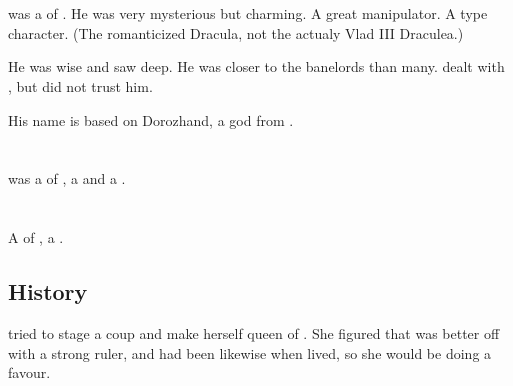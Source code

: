 \section{\Dorzand}
\index{\Dorzand}
\Dorzand was a \sathariah of \TiphredSerah.
He was very mysterious but charming.
A great manipulator.
A  type character. 
(The romanticized Dracula, not the actualy Vlad III Draculea.)

He was wise and saw deep.
He was closer to the banelords than many.
\Azraid dealt with \Dorzand, but did not trust him.

His name is based on Dorozhand, a god from 
\cite[]{LordDunsany:TheGodsofPegana}. 















\section{\Essaryn}
\index{\Essaryn}
\Essaryn was a \resvil{} of \TiphredSerah, a \thelyad and a . 















\section{\Ishicah}
\index{\Ishicah}
A \resvil{} of \TiphredSerah, a \sathariah{}. 









\subsection{History}
\Ishicah{} tried to stage a coup and make herself queen of \TiphredSerah. 
She figured that \CiriathSepher{} was better off with a strong ruler, and \Mystraacht{} had been likewise when \Zachirah{} lived, so she would be doing \TiphredSerah{} a favour. 

